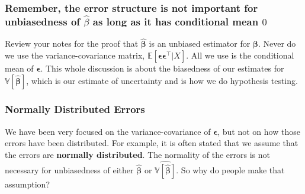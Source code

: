 \documentclass[]{article}
\begin{document}
\hypertarget{remember-the-error-structure-is-not-important-for-unbiasedness-of-hatbeta-as-long-as-it-has-conditional-mean-0}{%
\subsubsection{\texorpdfstring{Remember, the error structure is not
important for unbiasedness of \(\hat{\beta}\) as long as it has
conditional mean
\(0\)}{Remember, the error structure is not important for unbiasedness of \textbackslash hat\{\textbackslash beta\} as long as it has conditional mean 0}}\label{remember-the-error-structure-is-not-important-for-unbiasedness-of-hatbeta-as-long-as-it-has-conditional-mean-0}}

Review your notes for the proof that \(\hat{\bm{\beta}}\) is an unbiased
estimator for \(\bm{\beta}\). Never do we use the variance-covariance
matrix, \(\mathbb{E}[\bm{\epsilon}\bm{\epsilon}^\top|X]\). All we use is
the conditional mean of \(\bm{\epsilon}\). This whole discussion is
about the biasedness of our estimates for
\(\mathbb{V}[\hat{\bm{\beta}}]\), which is our estimate of uncertainty
and is how we do hypothesis testing.

\hypertarget{normally-distributed-errors}{%
\subsubsection{Normally Distributed
Errors}\label{normally-distributed-errors}}

We have been very focused on the variance-covariance of
\(\bm{\epsilon}\), but not on how those errors have been distributed.
For example, it is often stated that we assume that the errors are
\textbf{normally distributed}. The normality of the errors is not
necessary for unbiasedness of either \(\hat{\bm{\beta}}\) or
\(\widehat{\mathbb{V}[\hat{\bm{\beta}}]}\). So why do people make that
assumption?
\end{document}
